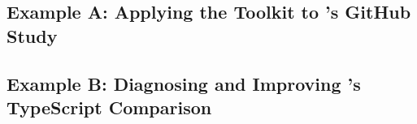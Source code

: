 \subsection{Example A: Applying the Toolkit to \citeauthor{DBLP:conf/sigsoft/RayPFD14}'s GitHub Study}
\label{sec:example-a}


\subsection{Example B: Diagnosing and Improving \citeauthor{DBLP:conf/msr/BognerM22}'s TypeScript Comparison}
\label{sec:example-b}



